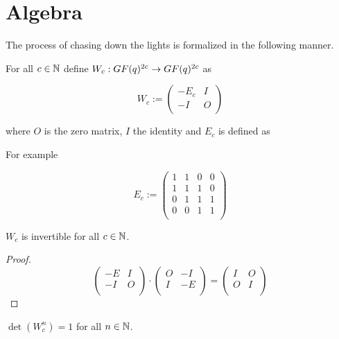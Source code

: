 \section{Algebra}

The process of chasing down the lights is formalized in the following
manner.

For all $c\in\mathbb{N}$ define $W_{c} : GF(q)^{2c} \rightarrow GF(q)^{2c}$
as

\[
W_{c} := \left(
\begin{array}{cc}
  -E_{c} & I \\
  -I    & O \\
\end{array}
\right)
\]

where $O$ is the zero matrix, $I$ the identity and $E_{c}$ is defined
as

For example

\[
E_{c} := \left(
\begin{array}{cccc}
  1 & 1 & 0 & 0 \\
  1 & 1 & 1 & 0 \\
  0 & 1 & 1 & 1 \\
  0 & 0 & 1 & 1 \\
\end{array}
\right)
\]

\begin{lemma}
  $W_{c}$ is invertible for all $c\in\mathbb{N}$.
\end{lemma}

\begin{proof}
  \[
  \left(
  \begin{array}{cc}
    -E & I \\
    -I & O \\
  \end{array}
  \right)
  \cdot
  \left(
  \begin{array}{cc}
    O & -I  \\
    I & -E \\
  \end{array}
  \right)
  =
  \left(
  \begin{array}{cc}
    I & O \\
    O & I \\
  \end{array}
  \right)
  \]
\end{proof}


\begin{lemma}
  $\det(W_{c}^{n}) = 1$ for all $n\in\mathbb{N}$.
\end{lemma}

